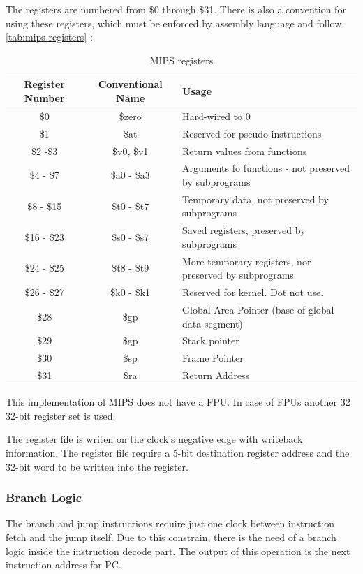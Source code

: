 The registers are numbered from \$0 through \$31. There is also a convention for using these registers, which must be enforced by assembly language and follow \autoref{tab:mips registers} 
\cite{regfiles}:

\begin{table}[h!]
	\centering
	 \caption{MIPS registers}	
	\begin{tabular}{ccl}
		\toprule[2pt]
		\textbf{Register Number} & \textbf{Conventional Name} &\textbf{Usage}  \\
		\toprule[2pt]
		\$0 & \$zero & Hard-wired to 0 \\
		\$1 & \$at & Reserved for pseudo-instructions \\
		\$2 -\$3 & \$v0, \$v1 & Return values from functions \\
		\$4 - \$7 & \$a0 - \$a3 & Arguments fo functions - not preserved by subprograms \\
		\$8 - \$15 & \$t0 - \$t7 & Temporary data, not preserved by subprograms \\
		\$16 - \$23 & \$s0 - \$s7 & Saved registers, preserved by subprograms \\
		\$24 - \$25 & \$t8 - \$t9 & More temporary registers, nor preserved by subprograms  \\
		\$26 - \$27 & \$k0 - \$k1  & Reserved for kernel. Dot not use. \\
		\$28 & \$gp & Global Area Pointer (base of global data segment) \\
		\$29 & \$gp & Stack pointer \\
		\$30 & \$sp & Frame Pointer \\
		\$31 & \$ra & Return Address \\
		\bottomrule[2pt]
	\end{tabular} 
	\label{tab:mips registers}
\end{table}

This implementation of MIPS does not have a FPU. In case of FPUs another 32 32-bit register set is used.

The register file is writen on the clock's negative edge with writeback information. The register file require a 5-bit destination register address and the 32-bit word to be written into the register.
\subsubsection{Branch Logic}
The branch and jump instructions require just one clock between instruction fetch and the jump itself. Due to this constrain, there is the need of a branch logic inside
the instruction decode part. The output of this operation is the next instruction address for PC. 


